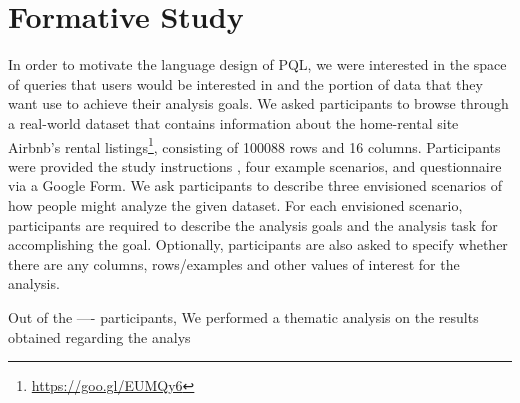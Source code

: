 \documentclass{sig-alternate-05-2015}
\begin{document}
\section{Formative Study}
\par In order to motivate the language design of PQL, we were interested in the space of queries that users would be interested in and the portion of data that they want use to achieve their analysis goals. We asked participants to browse through a real-world dataset that contains information about the home-rental site Airbnb's rental listings\footnote{\url{https://goo.gl/EUMQy6}}, consisting of 100088 rows and 16 columns. Participants were provided the study instructions , four example scenarios, and questionnaire via a Google Form. We ask participants to describe three envisioned scenarios of how people might analyze the given dataset. For each envisioned scenario, participants are required to describe the analysis goals and the analysis task for accomplishing the goal. Optionally, participants are also asked to specify whether there are any columns, rows/examples and other values of interest for the analysis. 
\par Out of the ---- participants, 
We performed a thematic analysis on the results obtained regarding the analys
\end{document}
